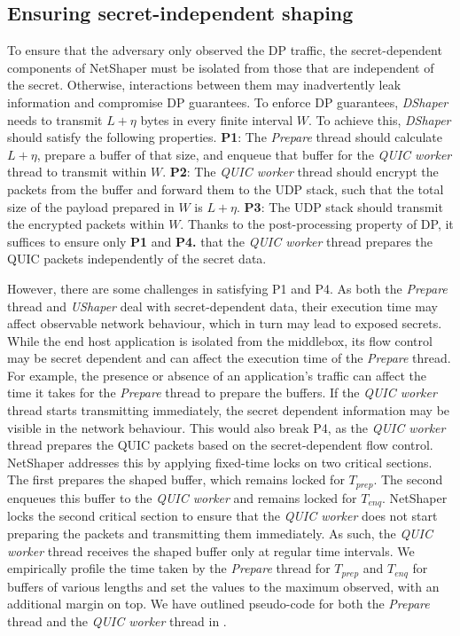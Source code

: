 \subsection{Ensuring secret-independent shaping}
\label{subsec:netshaper-secret-independent-shaping-implementation}

To ensure that the adversary only observed the DP traffic, the secret-dependent components of NetShaper must be isolated from those that are independent of the secret. 
Otherwise, interactions between them may inadvertently leak information and compromise DP guarantees.
To enforce DP guarantees, \textit{DShaper} needs to transmit $L + \eta$ bytes in every finite interval $W$.
To achieve this, \textit{DShaper} should satisfy the following properties.
\textbf{P1}: The \textit{Prepare} thread should calculate $L + \eta$, prepare a buffer of that size, and enqueue that buffer for the \textit{QUIC worker} thread to transmit within $W$.
\textbf{P2}: The \textit{QUIC worker} thread should encrypt the packets from the buffer and forward them to the UDP stack, such that the total size of the payload prepared in $W$ is $L + \eta$.
\textbf{P3}: The UDP stack should transmit the encrypted packets within $W$.
Thanks to the post-processing property of DP, it suffices to ensure only \textbf{P1} and \textbf{P4.} that the \textit{QUIC worker} thread prepares the QUIC packets independently of the secret data.

However, there are some challenges in satisfying P1 and P4.
As both the \textit{Prepare} thread and \textit{UShaper} deal with secret-dependent data, their execution time may affect observable network behaviour, which in turn may lead to exposed secrets.
While the end host application is isolated from the middlebox, its flow control may be secret dependent and can affect the execution time of the \textit{Prepare} thread.
For example, the presence or absence of an application's traffic can affect the time it takes for the \textit{Prepare} thread to prepare the buffers.
If the \textit{QUIC worker} thread starts transmitting immediately, the secret dependent information may be visible in the network behaviour. 
This would also break P4, as the \textit{QUIC worker} thread prepares the QUIC packets based on the secret-dependent flow control.
NetShaper addresses this by applying fixed-time locks on two critical sections.
The first prepares the shaped buffer, which remains locked for $T_{prep}$.
The second enqueues this buffer to the \textit{QUIC worker} and remains locked for $T_{enq}$.
NetShaper locks the second critical section to ensure that the \textit{QUIC worker} does not start preparing the packets and transmitting them immediately.
As such, the \textit{QUIC worker} thread receives the shaped buffer only at regular time intervals.
We empirically profile the time taken by the \textit{Prepare} thread for $T_{prep}$ and $T_{enq}$ for buffers of various lengths and set the values to the maximum observed, with an additional margin on top.
We have outlined pseudo-code for both the \textit{Prepare} thread and the \textit{QUIC worker} thread in .


